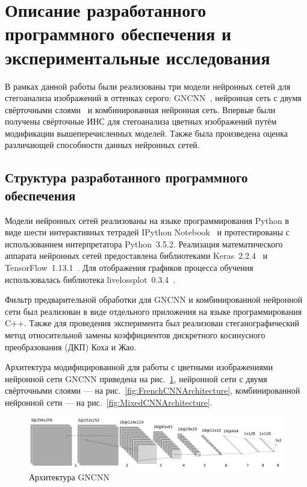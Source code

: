 

\section{Описание разработанного программного обеспечения и экспериментальные исследования}

В рамках данной работы были реализованы три модели нейронных сетей для стегоанализа изображений в оттенках серого: GNCNN~\cite{GNCNN}, нейронная сеть с двумя свёрточными слоями~\cite{FrenchCNN} и комбинированная нейронная сеть. Впервые были получены свёрточные ИНС для стегоанализа цветных изображений путём модификации вышеперечисленных моделей. Также была произведена оценка различающей способности данных нейронных сетей.

\subsection{Структура разработанного программного обеспечения}

Модели нейронных сетей реализованы на языке программирования Python в виде шести интерактивных тетрадей IPython Notebook~\cite{ipynb} и протестированы с использованием интерпретатора Python~3.5.2. Реализация математического аппарата нейронных сетей предоставлена библиотеками Keras~2.2.4~\cite{Keras} и TensorFlow~1.13.1~\cite{TensorFlow}. Для отображения графиков процесса обучения использовалась библиотека livelossplot~0.3.4~\cite{livelossplot}.

Фильтр предварительной обработки для GNCNN и комбинированной нейронной сети был реализован в виде отдельного приложения на языке программирования C++. Также для проведения эксперимента был реализован стеганографический метод относительной замены коэффициентов дискретного косинусного преобразования (ДКП) Коха и Жао.

Архитектура модифицированной для работы с цветными изображениями нейронной сети GNCNN приведена на рис.~\ref{fig:GNCNNArchitecture}, нейронной сети с двумя свёрточными слоями --- на рис.~\ref{fig:FrenchCNNArchitecture}, комбинированной нейронной сети --- на рис.~\ref{fig:MixedCNNArchitecture}.

\begin{figure}[h]
\centering
\includegraphics[width=1\textwidth]{include/graphics/gncnn_color_architecture}
\caption{Архитектура GNCNN}
\label{fig:GNCNNArchitecture}
\end{figure}

